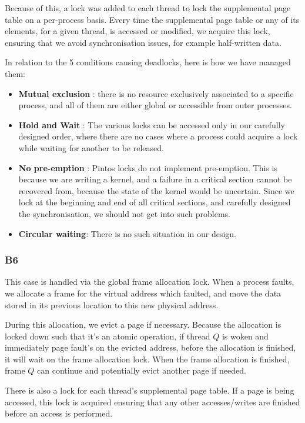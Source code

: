 \documentclass[a4wide, 11pt]{article}
\begin{document}
Because of this, a lock was added to each thread to lock the supplemental page table on a per-process basis. Every time the supplemental page table or any of its elements, for a given thread, is accessed or modified, we acquire this lock, ensuring that we avoid synchronisation issues, for example half-written data.

In relation to the 5 conditions causing deadlocks, here is how we have managed them:
\begin{itemize}
\item \textbf{Mutual exclusion} : there is no resource exclusively associated to a specific process, and all of them are either global or accessible from outer processes.
\item \textbf{Hold and Wait} : The various locks can be accessed only in our carefully designed order, where there are no cases where a process could acquire a lock while waiting for another to be released.
\item \textbf{No pre-emption} : Pintos locks do not implement pre-emption. This is because we are writing a kernel, and a failure in a critical section cannot be recovered from, because the state of the kernel would be uncertain. Since we lock at the beginning and end of all critical sections, and carefully designed the synchronisation, we should not get into such problems.
\item \textbf{Circular waiting}: There is no such situation in our design.
\end{itemize}

\subsubsection{B6}

This case is handled via the global frame allocation lock. When a process faults, we allocate a frame for the virtual address which faulted, and move the data stored in its previous location to this new physical address.

During this allocation, we evict a page if necessary. Because the allocation is locked down such that it's an atomic operation, if thread $Q$ is woken and immediately page fault's on the evicted address, before the allocation is finished, it will wait on the frame allocation lock. When the frame allocation is finished, frame $Q$ can continue and potentially evict another page if needed.

There is also a lock for each thread's supplemental page table. If a page is being accessed, this lock is acquired ensuring that any other accesses/writes are finished before an access is performed.
\end{document}

